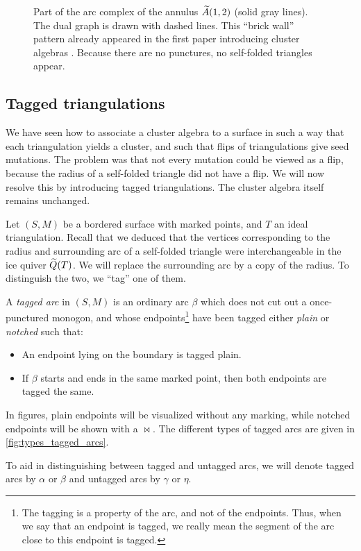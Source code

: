 \begin{example}
\begin{figure}[ht!]
\begin{tikzpicture}[nodes={shape=circle,draw},x=1ex,y=1ex, scale=2.5]
		\end{tikzpicture}

		\caption{Part of the arc complex of the annulus $\wt{A}(1,2)$ (solid gray lines). The dual graph is drawn with dashed lines. This ``brick wall'' pattern already appeared in the first paper introducing cluster algebras \parencite[Figure 4]{FominZelevinsky2002CAF}. Because there are no punctures, no
			self-folded triangles appear.} \label{fig:annulus1_2_exchange_graph}
	\end{figure}

\end{example}

\subsection{Tagged triangulations}\label{sec:tagged_triangulations}

We have seen how to associate a cluster algebra to a surface in such a way that each
triangulation yields a cluster, and such that flips of triangulations give seed
mutations. The problem was that not every mutation could be viewed as a flip, because
the radius of a self-folded triangle did not have a flip. We will now resolve this by
introducing tagged triangulations. The cluster algebra itself remains unchanged.

\medskip

Let $(S, M)$ be a bordered surface with marked points, and $T$ an ideal triangulation.
Recall that we deduced that the vertices corresponding to the radius and surrounding
arc of a self-folded triangle were interchangeable in the ice quiver $\tQ(T)$. We will
replace the surrounding arc by a copy of the radius. To distinguish the two, we ``tag''
one of them.

\begin{definition}

	A \emph{tagged arc} in $(S, M)$ is an ordinary arc $\beta$ which does
	not cut out a once-punctured monogon, and whose endpoints\footnote{The tagging is a
		property of the arc, and not of the endpoints. Thus, when we say that an endpoint is
		tagged, we really mean the segment of the arc close to this endpoint is tagged.} have
	been tagged either \emph{plain} or \emph{notched}
	such that:
	\begin{itemize}
		\item An endpoint lying on the boundary is tagged plain.
		\item If $\beta$ starts and ends in the same marked point, then both endpoints are tagged the
		      same.
	\end{itemize}
	In figures, plain endpoints will be visualized without any marking, while notched
	endpoints will be shown with a $\bowtie$. The different types
	of tagged arcs are given in \cref{fig:types_tagged_arcs}.

	To aid in distinguishing between tagged and untagged arcs, we will denote tagged arcs
	by $\alpha$ or $\beta$ and untagged arcs by $\gamma$ or $\eta$.
\end{definition}

